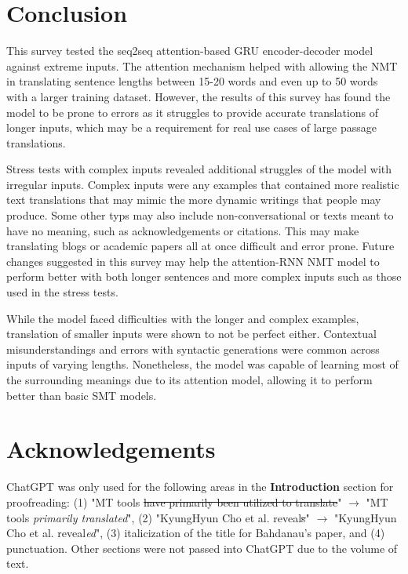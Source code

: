 \documentclass[11pt,a4paper]{article}
\begin{document}

\section{Conclusion}
This survey tested the seq2seq attention-based GRU encoder-decoder model against extreme inputs. The attention mechanism helped with allowing the NMT in translating sentence lengths between 15-20 words and even up to 50 words with a larger training dataset. However, the results of this survey has found the model to be prone to errors as it struggles to provide accurate translations of longer inputs, which may be a requirement for real use cases of large passage translations. 

Stress tests with complex inputs revealed additional struggles of the model with irregular inputs. Complex inputs were any examples that contained more realistic text translations that may mimic the more dynamic writings that people may produce. Some other typs may also include non-conversational or texts meant to have no meaning, such as acknowledgements or citations. This may make translating blogs or academic papers all at once difficult and error prone. Future changes suggested in this survey may help the attention-RNN NMT model to perform better with both longer sentences and more complex inputs such as those used in the stress tests.

While the model faced difficulties with the longer and complex examples, translation of smaller inputs were shown to not be perfect either. Contextual misunderstandings and errors with syntactic generations were common across inputs of varying lengths. Nonetheless, the model was capable of learning most of the surrounding meanings due to its attention model, allowing it to perform better than basic SMT models. 




\section{Acknowledgements}
ChatGPT was only used for the following areas in the \textbf{Introduction} section for proofreading: (1) "MT tools \st{have primarily been utilized to translate}" $\rightarrow$ "MT tools \textit{primarily translated}", (2) "KyungHyun Cho et al. reveal\st{s}" $\rightarrow$ "KyungHyun Cho et al. reveal\textit{ed}", (3) italicization of the title for Bahdanau's paper, and (4) punctuation. Other sections were not passed into ChatGPT due to the volume of text.
\end{document}
